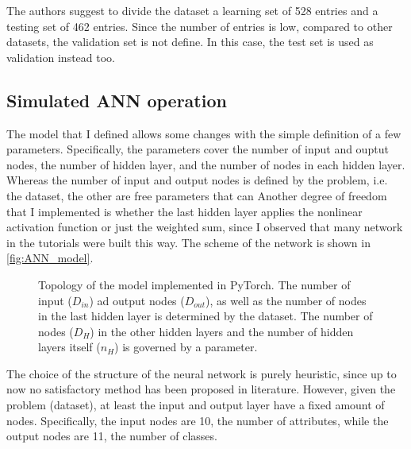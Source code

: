 The authors suggest to divide the dataset a learning set of \num{528} entries and a testing set of \num{462} entries.
Since the number of entries is low, compared to other datasets, the validation set is not define.
In this case, the test set is used as validation instead too.

\subsection{Simulated ANN operation}
\label{ssec:Simulated_ANN_operation}
The model that I defined allows some changes with the simple definition of a few parameters.
Specifically, the parameters cover the number of input and ouptut nodes, the number of hidden layer, and the number of nodes in each hidden layer.
Whereas the number of input and output nodes is defined by the problem, i.e. the dataset, the other are free parameters that can
Another degree of freedom that I implemented is whether the last hidden layer applies the nonlinear activation function or just the weighted sum, since I observed that many network in the tutorials were built this way.
The scheme of the network is shown in \autoref{fig:ANN_model}.

\begin{figure}[htbp]
	\centering
	
	\caption{Topology of the model implemented in PyTorch. The number of input ($D_{in}$) ad output nodes ($D_{out}$), as well as the number of nodes in the last hidden layer is determined by the dataset.
	The number of nodes ($D_{H}$) in the other hidden layers and the number of hidden layers itself ($n_{H}$) is governed by a parameter.}
	\label{fig:ANN_model}
\end{figure}

The choice of the structure of the neural network is purely heuristic, since up to now no satisfactory method has been proposed in literature.
However, given the problem (dataset), at least the input and output layer have a fixed amount of nodes.
Specifically, the input nodes are \num{10}, the number of attributes, while the output nodes are \num{11}, the number of classes.

